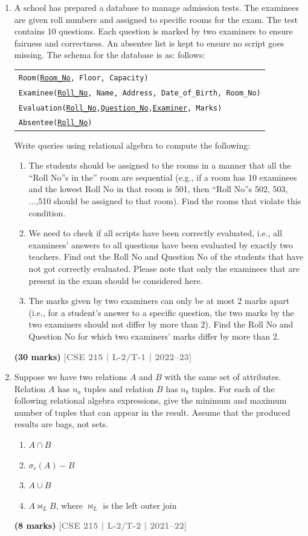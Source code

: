 \documentclass[12pt,a3paper]{article}
\newcommand{\yr}[1]{\hfill\textcolor{gray}{\small\textbf{[#1]}}}
\newcommand{\mk}[1]{\textcolor{orange!70!black}{\small\textbf{(#1 marks)}}}
\begin{document}
\begin{enumerate}
\item A school has prepared a database to manage admission tests. The examinees are given
roll numbers and assigned to specific rooms for the exam. The test contains 10 questions.
Each question is marked by two examiners to ensure fairness and correctness. An
absentee list is kept to ensure no script goes missing. The schema for the database is as:
follows:
\begin{center}
\begin{tabular}{l}
\texttt{Room(\underline{Room\_No}, Floor, Capacity)}\\
\texttt{Examinee(\underline{Roll\_No}, Name, Address, Date\_of\_Birth, Room\_No)}\\
\texttt{Evaluation(\underline{Roll\_No},\underline{Question\_No},\underline{Examiner}, Marks)}\\
\texttt{Absentee(\underline{Roll\_No})}
\end{tabular}
\end{center}
Write queries using relational algebra to compute the following:
\begin{enumerate}
\item The students should be assigned to the rooms in a manner that all the “Roll No”s in the”
room are sequential (e.g., if a room has 10 examinees and the lowest Roll No in that room
is 501, then “Roll No”s 502, 503, ...,510 should be assigned to that room). Find the
rooms that violate this condition.
\item We need to check if all scripts have been correctly evaluated, i.e., all examinees'
answers to all questions have been evaluated by exactly two teachers. Find out the Roll
No and Question No of the students that have not got correctly evaluated. Please note
that only the examinees that are present in the exam should be considered here.
\item The marks given by two examiners can only be at most 2 marks apart (i.e., for a
student's answer to a specific question, the two marks by the two examiners should not
differ by more than 2). Find the Roll No and Question No for which two examiners'
marks differ by more than 2.
\end{enumerate}
\mk{30} \yr{CSE 215 | L-2/T-1 | 2022--23}

\item Suppose we have two relations $A$ and $B$ with the same set of attributes. Relation $A$ has $n_a$ tuples and relation $B$ has $n_b$ tuples. For each of the following relational algebra expressions, give the minimum and maximum number of tuples that can appear in the result. Assume that the produced results are bags, not sets.
\begin{enumerate}
  \item $A \cap B$
  \item $\sigma_c(A) - B$
  \item $A \cup B$
  \item $A \bowtie_L B$, where $\bowtie_L$ is the left outer join
\end{enumerate}
\mk{8} \yr{CSE 215 | L-2/T-2 | 2021--22}


\end{enumerate}
\end{document}
